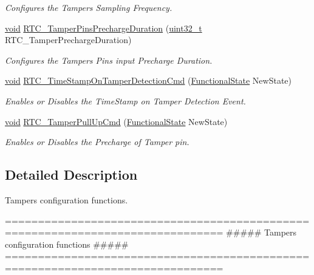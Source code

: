 \begin{DoxyCompactItemize}
\begin{DoxyCompactList}\small\item\em Configures the Tampers Sampling Frequency. \end{DoxyCompactList}\item 
\hyperlink{group___n_a_m_e_ga18028b8badbf1ea7e704ccac3c488e82}{void} \hyperlink{group___r_t_c___group9_gafc176a013076a651862dc6a957286025}{R\-T\-C\-\_\-\-Tamper\-Pins\-Precharge\-Duration} (\hyperlink{stdint_8h_a435d1572bf3f880d55459d9805097f62}{uint32\-\_\-t} R\-T\-C\-\_\-\-Tamper\-Precharge\-Duration)
\begin{DoxyCompactList}\small\item\em Configures the Tampers Pins input Precharge Duration. \end{DoxyCompactList}\item 
\hyperlink{group___n_a_m_e_ga18028b8badbf1ea7e704ccac3c488e82}{void} \hyperlink{group___r_t_c___group9_ga29c82fceefd21a78dc55ccc5bcc1ed59}{R\-T\-C\-\_\-\-Time\-Stamp\-On\-Tamper\-Detection\-Cmd} (\hyperlink{group___exported__types_gac9a7e9a35d2513ec15c3b537aaa4fba1}{Functional\-State} New\-State)
\begin{DoxyCompactList}\small\item\em Enables or Disables the Time\-Stamp on Tamper Detection Event. \end{DoxyCompactList}\item 
\hyperlink{group___n_a_m_e_ga18028b8badbf1ea7e704ccac3c488e82}{void} \hyperlink{group___r_t_c___group9_ga981b9c654e521282a2020a81118c8c3c}{R\-T\-C\-\_\-\-Tamper\-Pull\-Up\-Cmd} (\hyperlink{group___exported__types_gac9a7e9a35d2513ec15c3b537aaa4fba1}{Functional\-State} New\-State)
\begin{DoxyCompactList}\small\item\em Enables or Disables the Precharge of Tamper pin. \end{DoxyCompactList}\end{DoxyCompactItemize}


\subsection{Detailed Description}
Tampers configuration functions. \begin{DoxyVerb} ===============================================================================
                ##### Tampers configuration functions #####
 ===============================================================================  \end{DoxyVerb}


